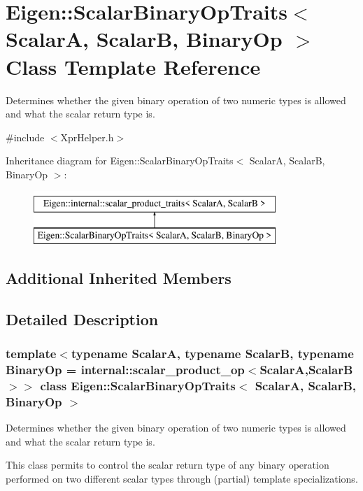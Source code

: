 \hypertarget{struct_eigen_1_1_scalar_binary_op_traits}{}\section{Eigen\+::Scalar\+Binary\+Op\+Traits$<$ ScalarA, ScalarB, Binary\+Op $>$ Class Template Reference}
\label{struct_eigen_1_1_scalar_binary_op_traits}


Determines whether the given binary operation of two numeric types is allowed and what the scalar return type is.  




{\ttfamily \#include $<$Xpr\+Helper.\+h$>$}

Inheritance diagram for Eigen\+::Scalar\+Binary\+Op\+Traits$<$ ScalarA, ScalarB, Binary\+Op $>$\+:\begin{figure}[H]
\begin{center}
\leavevmode
\includegraphics[height=2.000000cm]{struct_eigen_1_1_scalar_binary_op_traits}
\end{center}
\end{figure}
\subsection*{Additional Inherited Members}


\subsection{Detailed Description}
\subsubsection*{template$<$typename ScalarA, typename ScalarB, typename Binary\+Op = internal\+::scalar\+\_\+product\+\_\+op$<$\+Scalar\+A,\+Scalar\+B$>$$>$\newline
class Eigen\+::\+Scalar\+Binary\+Op\+Traits$<$ Scalar\+A, Scalar\+B, Binary\+Op $>$}

Determines whether the given binary operation of two numeric types is allowed and what the scalar return type is. 

This class permits to control the scalar return type of any binary operation performed on two different scalar types through (partial) template specializations.

